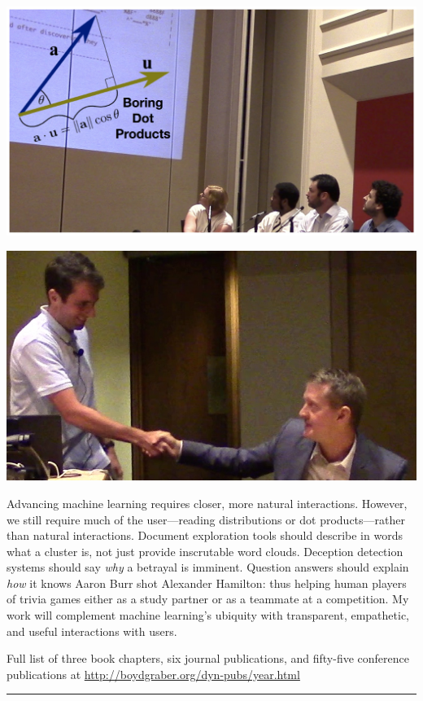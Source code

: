 \documentclass[11pt]{amsart}
\begin{document}
  \begin{minipage}[b]{0.4\textwidth}
    \includegraphics[width=\textwidth]{images/boring_dot_products}
  \end{minipage}
  \hfill
\begin{minipage}[b]{0.4\textwidth}
    \includegraphics[width=\textwidth]{images/jennings_handshake}
  \end{minipage}


Advancing machine learning requires closer, more natural interactions.
However, we still require much of the user---reading distributions or
dot products---rather than natural interactions.  Document
exploration tools should describe in words what a cluster is, not just
provide inscrutable word clouds.  Deception detection systems should
say \emph{why} a betrayal is imminent.  Question answers should
explain \emph{how} it knows Aaron Burr shot Alexander Hamilton: thus
helping human players of trivia games either as a study partner or as
a teammate at a competition. My work will complement machine
learning's ubiquity with transparent, empathetic, and useful
interactions with users.

\vspace{2cm}

\small


\begin{center}
Full list of  three book chapters, six journal publications, and fifty-five conference
publications at \url{http://boydgraber.org/dyn-pubs/year.html}
\end{center}

%

\noindent\rule{4cm}{0.4pt}
\end{document}
